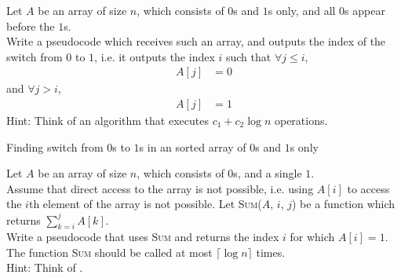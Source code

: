 \documentclass[titlepage, fleqn, a4paper, 12pt, twoside]{article}
\theoremstyle{definition}
\theoremstyle{theorem}
\begin{document}
\begin{question}
	Let $A$ be an array of size $n$, which consists of $0$s and $1$s only, and all $0$s appear before the $1$s.\\
	Write a pseudocode which receives such an array, and outputs the index of the switch from $0$ to $1$, i.e. it outputs the index $i$ such that $\forall j \le i$,
	\begin{align*}
		A[j] & = 0
	\end{align*}
	and $\forall j > i$,
	\begin{align*}
		A[j] & = 1
	\end{align*}
	Hint: Think of an algorithm that executes $c_1 + c_2 \log n$ operations.
\end{question}

\begin{solution}
	\begin{algorithm}
		\begin{algorithmic}[1]
			\Statex
				\EndIf
				\EndIf
					\Else
					\EndIf
				\EndWhile
			\EndFunction
		\end{algorithmic}
		\caption{Finding switch from $0$s to $1$s in an sorted array of $0$s and $1$s only}
	\end{algorithm}
\end{solution}

\begin{question}
	Let $A$ be an array of size $n$, which consists of $0$s, and a single $1$.\\
	Assume that direct access to the array is not possible, i.e. using $A[i]$ to access the $i$th element of the array is not possible.
	Let \textsc{Sum}($A$, $i$, $j$) be a function which returns $\sum\limits_{k = i}^{j} A[k]$.\\
	Write a pseudocode that uses \textsc{Sum} and returns the index $i$ for which $A[i] = 1$.
	The function \textsc{Sum} should be called at most $\lceil \log n \rceil$ times.\\
	Hint: Think of .
\end{question}
\end{document}
